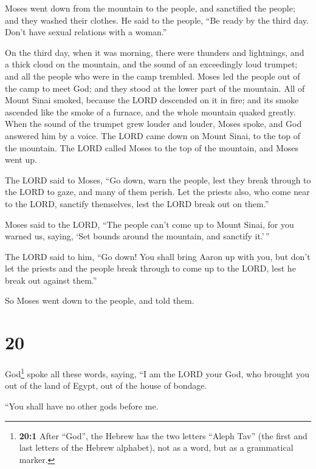  Moses went down from the mountain to the people, and
sanctified the people; and they washed their clothes.  He
said to the people, ``Be ready by the third day. Don't have sexual
relations with a woman.''

 On the third day, when it was morning, there were
thunders and lightnings, and a thick cloud on the mountain, and the
sound of an exceedingly loud trumpet; and all the people who were in the
camp trembled.  Moses led the people out of the camp to
meet God; and they stood at the lower part of the mountain.
 All of Mount Sinai smoked, because the LORD descended on
it in fire; and its smoke ascended like the smoke of a furnace, and the
whole mountain quaked greatly.  When the sound of the
trumpet grew louder and louder, Moses spoke, and God answered him by a
voice.  The LORD came down on Mount Sinai, to the top of
the mountain. The LORD called Moses to the top of the mountain, and
Moses went up.

 The LORD said to Moses, ``Go down, warn the people, lest
they break through to the LORD to gaze, and many of them perish.
 Let the priests also, who come near to the LORD,
sanctify themselves, lest the LORD break out on them.''

 Moses said to the LORD, ``The people can't come up to
Mount Sinai, for you warned us, saying, `Set bounds around the mountain,
and sanctify it.'\,''

 The LORD said to him, ``Go down! You shall bring Aaron
up with you, but don't let the priests and the people break through to
come up to the LORD, lest he break out against them.''

 So Moses went down to the people, and told them.

\hypertarget{section-19}{%
\section{20}\label{section-19}}

 God\footnote{\textbf{20:1} After ``God'', the Hebrew has
  the two letters ``Aleph Tav'' (the first and last letters of the
  Hebrew alphabet), not as a word, but as a grammatical marker.} spoke
all these words, saying,  ``I am the LORD your God, who
brought you out of the land of Egypt, out of the house of bondage.

 ``You shall have no other gods before me.

